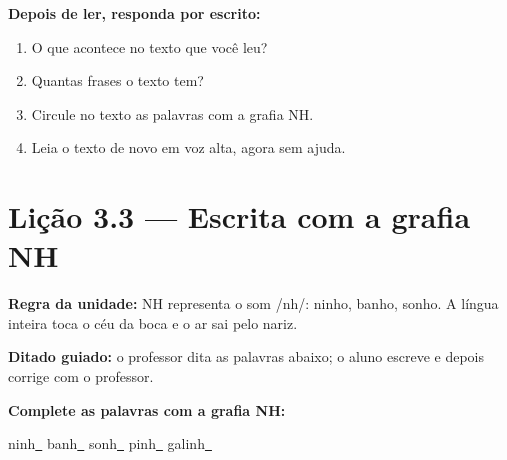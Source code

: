 \textbf{Depois de ler, responda por escrito:}
\begin{enumerate}

  \item O que acontece no texto que você leu?
  \begin{center}
  \underline{\hspace{12cm}}
  \end{center}

  \item Quantas frases o texto tem?
  \begin{center}
  \underline{\hspace{12cm}}
  \end{center}

  \item Circule no texto as palavras com a grafia NH.

  \item Leia o texto de novo em voz alta, agora sem ajuda.

\end{enumerate}

\section{Lição 3.3 --- Escrita com a grafia NH}

\noindent\textbf{Regra da unidade:} NH representa o som /nh/: ninho, banho, sonho. A língua inteira toca o céu da boca e o ar sai pelo nariz.


\noindent\textbf{Ditado guiado:} o professor dita as palavras abaixo; o aluno escreve e depois corrige com o professor.

\begin{center}
  \underline{\hspace{2.3cm}} \quad \underline{\hspace{2.3cm}} \quad \underline{\hspace{2.3cm}} \quad \underline{\hspace{2.3cm}}

  \underline{\hspace{2.3cm}} \quad \underline{\hspace{2.3cm}} \quad \underline{\hspace{2.3cm}} \quad \underline{\hspace{2.3cm}}
\end{center}

\noindent\textbf{Complete as palavras com a grafia NH:}
\begin{center}
  ninh\underline{~} \quad banh\underline{~} \quad sonh\underline{~} \quad pinh\underline{~} \quad galinh\underline{~}
\end{center}

